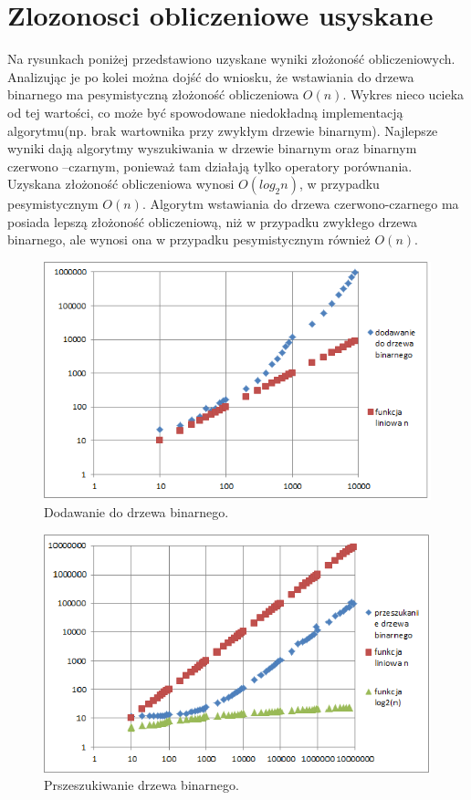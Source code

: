 	\section{Zlozonosci obliczeniowe usyskane}\label{sec:Zlozonosci obliczeniowe usyskane}
	Na rysunkach poniżej przedstawiono uzyskane wyniki złożoność obliczeniowych. Analizując je po kolei można dojść do wniosku, że wstawiania do drzewa binarnego ma pesymistyczną złożoność obliczeniowa $O(n)$. Wykres nieco ucieka od tej wartości, co może być spowodowane niedokładną implementacją algorytmu(np. brak wartownika przy zwykłym drzewie binarnym). Najlepsze wyniki dają algorytmy wyszukiwania w drzewie binarnym oraz binarnym czerwono –czarnym, ponieważ tam działają tylko operatory porównania. Uzyskana złożoność obliczeniowa wynosi $O(log_{2}n)$, w przypadku pesymistycznym $O(n)$. Algorytm wstawiania do drzewa czerwono-czarnego ma posiada lepszą złożoność obliczeniową, niż w przypadku zwykłego drzewa binarnego, ale wynosi ona w przypadku pesymistycznym również $O(n)$.
	\begin{figure}
	\centering
	\includegraphics[scale=0.9]{1.png}
	\caption{Dodawanie do drzewa binarnego.}
	\label{fig:1}
	\end{figure}
	\begin{figure}
	\centering
	\includegraphics[scale=0.90]{2.png}
	\caption{Prszeszukiwanie drzewa binarnego.}
	\label{fig:2}
	\end{figure}
